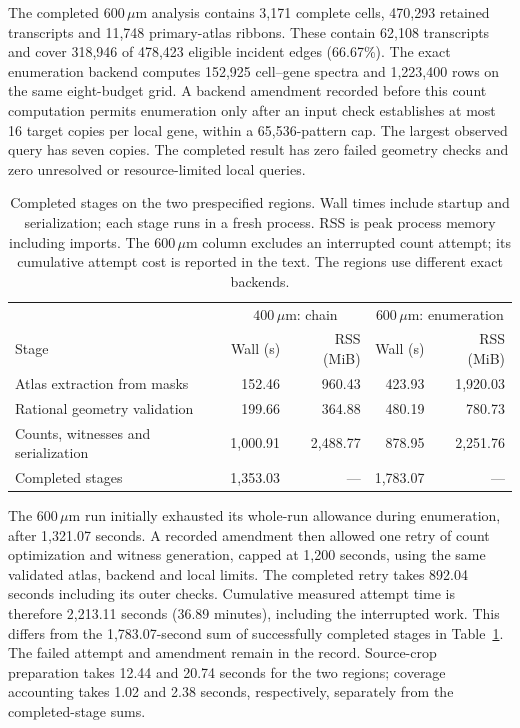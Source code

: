 \documentclass[10pt,letterpaper]{article}
\begin{document}
The completed $600\,\mu\mathrm m$ analysis contains 3,171 complete cells, 470,293 retained transcripts and 11,748 primary-atlas ribbons. These contain 62,108 transcripts and cover 318,946 of 478,423 eligible incident edges (66.67\%). The exact enumeration backend computes 152,925 cell--gene spectra and 1,223,400 rows on the same eight-budget grid. A backend amendment recorded before this count computation permits enumeration only after an input check establishes at most 16 target copies per local gene, within a 65,536-pattern cap. The largest observed query has seven copies. The completed result has zero failed geometry checks and zero unresolved or resource-limited local queries.

\begin{table}[ht]\centering
\begin{tabular}{lrrrr}\toprule
&\multicolumn{2}{c}{$400\,\mu\mathrm m$: chain}&\multicolumn{2}{c}{$600\,\mu\mathrm m$: enumeration}\\
Stage&Wall (s)&RSS (MiB)&Wall (s)&RSS (MiB)\\\midrule
Atlas extraction from masks&152.46&960.43&423.93&1,920.03\\
Rational geometry validation&199.66&364.88&480.19&780.73\\
Counts, witnesses and serialization&1,000.91&2,488.77&878.95&2,251.76\\\midrule
Completed stages&1,353.03&---&1,783.07&---\\\bottomrule
\end{tabular}
\caption{Completed stages on the two prespecified regions. Wall times include startup and serialization; each stage runs in a fresh process. RSS is peak process memory including imports. The $600\,\mu\mathrm m$ column excludes an interrupted count attempt; its cumulative attempt cost is reported in the text. The regions use different exact backends.}\label{tab:contiguous-timing}
\end{table}

The $600\,\mu\mathrm m$ run initially exhausted its whole-run allowance during enumeration, after 1,321.07 seconds. A recorded amendment then allowed one retry of count optimization and witness generation, capped at 1,200 seconds, using the same validated atlas, backend and local limits. The completed retry takes 892.04 seconds including its outer checks. Cumulative measured attempt time is therefore 2,213.11 seconds (36.89 minutes), including the interrupted work. This differs from the 1,783.07-second sum of successfully completed stages in Table~\ref{tab:contiguous-timing}. The failed attempt and amendment remain in the record. Source-crop preparation takes 12.44 and 20.74 seconds for the two regions; coverage accounting takes 1.02 and 2.38 seconds, respectively, separately from the completed-stage sums.
\end{document}
